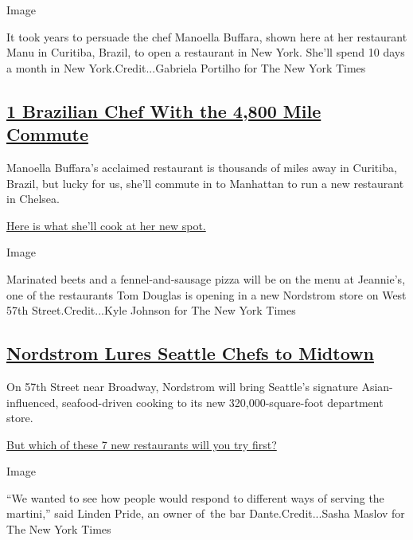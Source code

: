 Image

It took years to persuade the chef Manoella Buffara, shown here at her
restaurant Manu in Curitiba, Brazil, to open a restaurant in New York.
She'll spend 10 days a month in New York.Credit...Gabriela Portilho for
The New York Times

\hypertarget{1-brazilian-chef-with-the-4800-mile-commute}{%
\subsection{\texorpdfstring{\href{https://www.nytimes3xbfgragh.onion/2019/09/03/dining/ella-restaurant-manoella-buffara.html}{1
Brazilian Chef With the 4,800 Mile
Commute}}{1 Brazilian Chef With the 4,800 Mile Commute}}\label{1-brazilian-chef-with-the-4800-mile-commute}}

Manoella Buffara's acclaimed restaurant is thousands of miles away in
Curitiba, Brazil, but lucky for us, she'll commute in to Manhattan to
run a new restaurant in Chelsea.

\href{https://www.nytimes3xbfgragh.onion/2019/09/03/dining/ella-restaurant-manoella-buffara.html}{Here
is what she'll cook at her new spot.}

Image

Marinated beets and a fennel-and-sausage pizza will be on the menu at
Jeannie's, one of the restaurants Tom Douglas is opening in a new
Nordstrom store on West 57th Street.Credit...Kyle Johnson for The New
York Times

\hypertarget{nordstrom-lures-seattle-chefs-to-midtown}{%
\subsection{\texorpdfstring{\href{https://www.nytimes3xbfgragh.onion/2019/09/03/dining/nordstrom-midtown-nyc.html}{Nordstrom
Lures Seattle Chefs to
Midtown}}{Nordstrom Lures Seattle Chefs to Midtown}}\label{nordstrom-lures-seattle-chefs-to-midtown}}

On 57th Street near Broadway, Nordstrom will bring Seattle's signature
Asian-influenced, seafood-driven cooking to its new 320,000-square-foot
department store.

\href{https://www.nytimes3xbfgragh.onion/2019/09/03/dining/nordstrom-midtown-nyc.html}{But
which of these 7 new restaurants will you try first?}

Image

``We wanted to see how people would respond to different ways of serving
the martini,'' said Linden Pride, an owner of~the bar
Dante.Credit...Sasha Maslov for The New York Times

